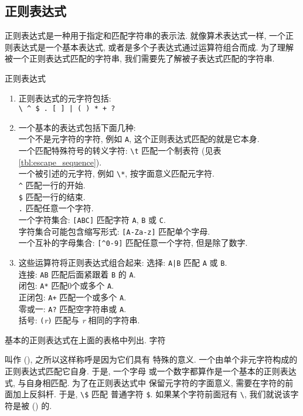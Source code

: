\subsection{正则表达式}
\label{subsec:regular_expressions}
正则表达式是一种用于指定和匹配字符串的表示法. 就像算术表达式一样,
一个正则表达式是一个基本表达式, 或者是多个子表达式通过运算符组合而成.
为了理解被一个正则表达式匹配的字符串, 我们需要先了解被子表达式匹配的字符串.
\begin{summary}{正则表达式}
\begin{enumerate}
\item 正则表达式的元字符包括: \\
    \verb'\ ^ $ . [ ] | ( ) * + ?'
\item 一个基本的表达式包括下面几种: \\
    一个不是元字符的字符, 例如 \verb'A', 这个正则表达式匹配的就是它本身. \\
    一个匹配特殊符号的转义字符: \verb'\t' 匹配一个制表符 (见表
    \ref{tbl:escape_sequence}). \\
    一个被引述的元字符, 例如 \verb'\*', 按字面意义匹配元字符. \\
    \verb'^' 匹配一行的开始. \\
    \verb'$' 匹配一行的结束. \\
    \verb'.' 匹配任意一个字符. \\
    一个字符集合: \verb'[ABC]' 匹配字符 \verb'A', \verb'B' 或 \verb'C'. \\
    字符集合可能包含缩写形式: \verb'[A-Za-z]' 匹配单个字母. \\
    一个互补的字母集合: \verb'[^0-9]' 匹配任意一个字符, 但是除了数字.
\item 这些运算符将正则表达式组合起来:
    选择: \verb'A|B' 匹配 \verb'A' 或 \verb'B'. \\
    连接: \verb'AB' 匹配后面紧跟着 \verb'B' 的 \verb'A'. \\
    闭包: \verb'A*' 匹配0个或多个 \verb'A'. \\
    正闭包: \verb'A+' 匹配一个或多个 \verb'A'. \\
    零或一: \verb'A?' 匹配空字符串或 \verb'A'. \\
    括号: \verb'('\textit{r}\verb')' 匹配与 \textit{r} 相同的字符串.
\end{enumerate}
\end{summary}

基本的正则表达式在上面的表格中列出. 字符
叫作  (), 之所以这样称呼是因为它们具有
特殊的意义. 一个由单个非元字符构成的正则表达式匹配它自身. 于是, 一个字母
或一个数字都算作是一个基本的正则表达式, 与自身相匹配.  为了在正则表达式中
保留元字符的字面意义, 需要在字符的前面加上反斜杆. 于是, \verb'\$' 匹配
普通字符 \verb'$'. 如果某个字符前面冠有 \verb'\', 我们就说该字符是被
 () 的.

